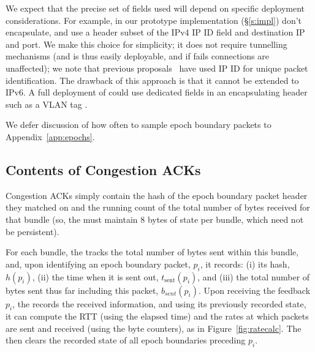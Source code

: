 We expect that the precise set of fields used will depend on specific deployment considerations.
For example, in our prototype implementation (\S\ref{s:impl}) don't encapsulate, and use a header subset of the IPv4 IP ID field and destination IP and port. 
We make this choice for simplicity; it does not require tunnelling mechanisms (and is thus easily deployable, and if \name fails connections are unaffected); we note that previous proposals~\cite{ip-traceback} have used IP ID for unique packet identification. The drawback of this approach is that it cannot be extended to IPv6.
A full deployment  of \name could use dedicated fields in an encapsulating header such as a VLAN tag .

We defer discussion of how often to sample epoch boundary packets to Appendix~\ref{app:epochs}.

\subsection{Contents of Congestion ACKs}
\label{s:measure:compute}
\newcommand{\pone}{$p_{i-1}$}
\newcommand{\hpone}{$h(p_{i-1})$}
\newcommand{\sone}{$s_{i-1}$}
\newcommand{\rone}{$r_{i-1}$}
\newcommand{\ptwo}{$p_{i}$}
\newcommand{\hptwo}{$h(p_{i})$}
\newcommand{\stwo}{$s_{i}$}
\newcommand{\rtwo}{$r_{i}$}
\newcommand{\atwo}{$a_{i}$}
\newcommand{\sentone}{$sent_{i-1}$}
\newcommand{\recvdone}{$rcvd_{i-1}$}
\newcommand{\senttwo}{$sent_{i}$}
\newcommand{\recvdtwo}{$rcvd_{i}$}

Congestion ACKs simply contain the hash of the epoch boundary packet header they matched on and the running count of the total number of bytes received for that bundle (so, the \outbox must maintain 8 bytes of state per bundle, which need not be persistent).

For each bundle, the \inbox tracks the total number of bytes sent within this bundle, and, upon identifying an epoch boundary packet, $p_i$, it records: (i) its hash, $h(p_i)$, (ii) the time when it is sent out, $t_{\text{sent}}(p_i)$, and (iii) the total number of bytes sent thus far including this packet, $b_{sent}(p_i)$. 
Upon receiving the feedback $p_i$, the \inbox records the received information, and using its previously recorded state, it can compute the RTT (using the elapsed time) and the rates at which packets are sent and received (using the byte counters), as in Figure~\ref{fig:ratecalc}.
The \inbox then clears the recorded state of all epoch boundaries preceding $p_i$.

